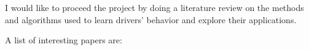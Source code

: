 I would like to proceed the project by doing a literature review on the methods and algorithms used to learn drivers' behavior and explore their applications.

A list of interesting papers are: \cite{4141877, 4298904, Buxton2003125, 4633642, 5, 6, Moeslund200690, 4142930, 1717363, 898310, 7, Kuge2000}
